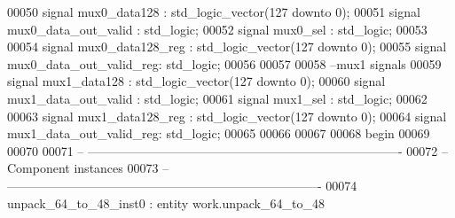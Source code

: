 \begin{DoxyCode}
00050 \textcolor{keywordflow}{signal} \textcolor{vhdlchar}{mux0_data128}             \textcolor{vhdlchar}{:} \textcolor{comment}{std\_logic\_vector}\textcolor{vhdlchar}{(}\textcolor{vhdllogic}{}\textcolor{vhdllogic}{127} \textcolor{keywordflow}{downto} \textcolor{vhdllogic}{}\textcolor{vhdllogic}{0}\textcolor{vhdlchar}{)};
00051 \textcolor{keywordflow}{signal} \textcolor{vhdlchar}{mux0_data_out_valid}      \textcolor{vhdlchar}{:} \textcolor{comment}{std\_logic};
00052 \textcolor{keywordflow}{signal} \textcolor{vhdlchar}{mux0_sel}                 \textcolor{vhdlchar}{:} \textcolor{comment}{std\_logic};
00053 
00054 \textcolor{keywordflow}{signal} \textcolor{vhdlchar}{mux0_data128_reg}         \textcolor{vhdlchar}{:} \textcolor{comment}{std\_logic\_vector}\textcolor{vhdlchar}{(}\textcolor{vhdllogic}{}\textcolor{vhdllogic}{127} \textcolor{keywordflow}{downto} \textcolor{vhdllogic}{}\textcolor{vhdllogic}{0}\textcolor{vhdlchar}{)};
00055 \textcolor{keywordflow}{signal} \textcolor{vhdlchar}{mux0_data_out_valid_reg}\textcolor{vhdlchar}{:} \textcolor{comment}{std\_logic};
00056 
00057 
00058 \textcolor{keyword}{--mux1 signals}
00059 \textcolor{keywordflow}{signal} \textcolor{vhdlchar}{mux1_data128}             \textcolor{vhdlchar}{:} \textcolor{comment}{std\_logic\_vector}\textcolor{vhdlchar}{(}\textcolor{vhdllogic}{}\textcolor{vhdllogic}{127} \textcolor{keywordflow}{downto} \textcolor{vhdllogic}{}\textcolor{vhdllogic}{0}\textcolor{vhdlchar}{)};
00060 \textcolor{keywordflow}{signal} \textcolor{vhdlchar}{mux1_data_out_valid}      \textcolor{vhdlchar}{:} \textcolor{comment}{std\_logic};
00061 \textcolor{keywordflow}{signal} \textcolor{vhdlchar}{mux1_sel}                 \textcolor{vhdlchar}{:} \textcolor{comment}{std\_logic};
00062 
00063 \textcolor{keywordflow}{signal} \textcolor{vhdlchar}{mux1_data128_reg}         \textcolor{vhdlchar}{:} \textcolor{comment}{std\_logic\_vector}\textcolor{vhdlchar}{(}\textcolor{vhdllogic}{}\textcolor{vhdllogic}{127} \textcolor{keywordflow}{downto} \textcolor{vhdllogic}{}\textcolor{vhdllogic}{0}\textcolor{vhdlchar}{)};
00064 \textcolor{keywordflow}{signal} \textcolor{vhdlchar}{mux1_data_out_valid_reg}\textcolor{vhdlchar}{:} \textcolor{comment}{std\_logic};
00065 
00066 
00067   
00068 \textcolor{vhdlkeyword}{begin}
00069 
00070 
00071 \textcolor{keyword}{-- ----------------------------------------------------------------------------}
00072 \textcolor{keyword}{-- Component instances}
00073 \textcolor{keyword}{-- ----------------------------------------------------------------------------}
00074 unpack\_64\_to\_48\_inst0 : \textcolor{keywordflow}{entity} work.unpack_64_to_48 

\end{DoxyCode}
